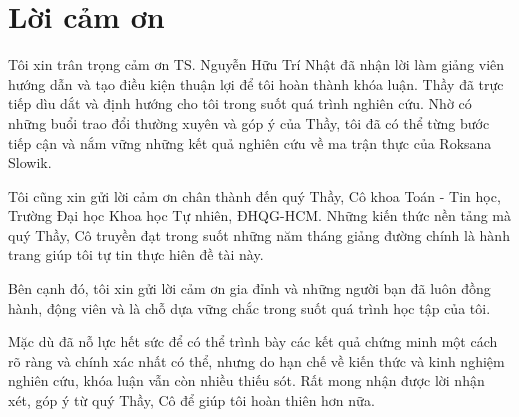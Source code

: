 \chapter*{Lời cảm ơn}

Tôi xin trân trọng cảm ơn TS. Nguyễn Hữu Trí Nhật đã nhận lời làm giảng viên hướng dẫn và tạo điều kiện thuận lợi để tôi hoàn thành khóa luận. Thầy đã trực tiếp dìu dắt và định hướng cho tôi trong suốt quá trình nghiên cứu. Nhờ có những buổi trao đổi thường xuyên và góp ý của Thầy, tôi đã có thể từng bước tiếp cận và nắm vững những kết quả nghiên cứu về ma trận thực của Roksana Slowik.

Tôi cũng xin gửi lời cảm ơn chân thành đến quý Thầy, Cô khoa Toán - Tin học, Trường Đại học Khoa học Tự nhiên, ĐHQG-HCM. Những kiến thức nền tảng mà quý Thầy, Cô truyền đạt trong suốt những năm tháng giảng đường chính là hành trang giúp tôi tự tin thực hiên đề tài này.

Bên cạnh đó, tôi xin gửi lời cảm ơn gia đỉnh và những người bạn đã luôn đồng hành, động viên và là chỗ dựa vững chắc trong suốt quá trình học tập của tôi.

Mặc dù đã nỗ lực hết sức để có thể trình bày các kết quả chứng minh một cách rõ ràng và chính xác nhất có thể, nhưng do hạn chế về kiến thức và kinh nghiệm nghiên cứu, khóa luận vẫn còn nhiều thiếu sót. Rất mong nhận được lời nhận xét, góp ý từ quý Thầy, Cô để giúp tôi hoàn thiên hơn nữa.


